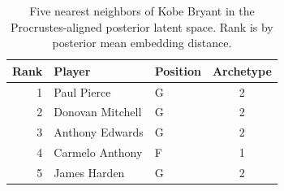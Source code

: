 \begin{table}[htbp]
  \centering\small
  \begin{tabular}{rllc}
    \toprule
    Rank & Player & Position & Archetype \\
    \midrule
    1 & Paul Pierce & G & 2 \\
    2 & Donovan Mitchell & G & 2 \\
    3 & Anthony Edwards & G & 2 \\
    4 & Carmelo Anthony & F & 1 \\
    5 & James Harden & G & 2 \\
    \bottomrule
  \end{tabular}
  \caption{Five nearest neighbors of Kobe Bryant in the Procrustes-aligned posterior latent space. Rank is by posterior mean embedding distance.}
  \label{tab:Kobe_Bryant_neighbors}
\end{table}

